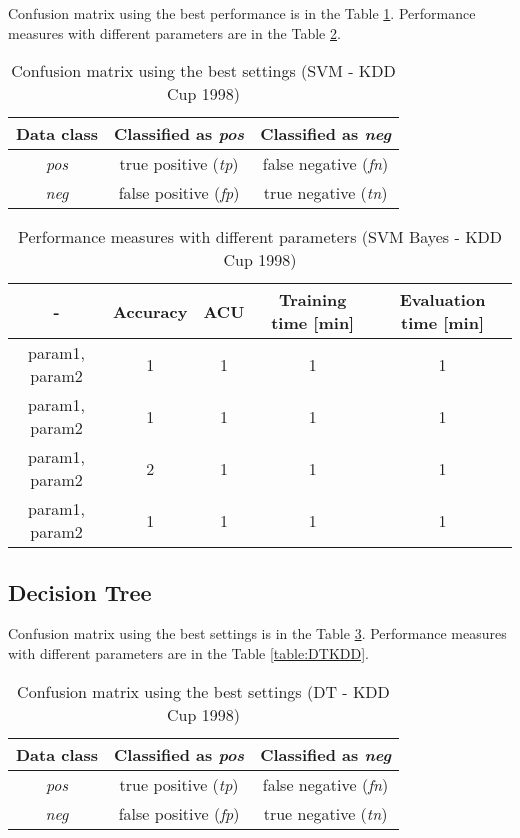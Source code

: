 \documentclass[11pt,a4paper,titlepage]{article}
\begin{document}
Confusion matrix using the best performance is in the Table \ref{table:confusionMatrixSVMKDD}. Performance measures with different parameters are in the Table \ref{table:SVMKDD}.
\begin{table}
  \centering
  \begin{tabular}{| c | c | c |}
    \hline
    Data class & Classified as \textit{pos} & Classified as \textit{neg} \\ \hline
    \textit{pos} & true positive (\textit{tp}) & false negative (\textit{fn}) \\ \hline
    \textit{neg} & false positive (\textit{fp}) & true negative (\textit{tn}) \\
    \hline
  \end{tabular}
  \caption{Confusion matrix using the best settings (SVM - KDD Cup 1998)}
  \label{table:confusionMatrixSVMKDD}
  \end{table}
  
  \begin{table}
  \centering
  \begin{tabular}{| c | c | c | c | c |}
    \hline
     		-	   & Accuracy & 	ACU 	& Training time [min] & Evaluation time [min] \\ \hline
    param1, param2 &  1 	  &     1		& 		1			  & 		1 		\\ \hline
    param1, param2 & 	1	  & 	1 		& 		1			  &			1 		\\ \hline
    param1, param2 & 	2	  & 	1		& 		1			  &			1		\\ \hline
    param1, param2 &  1       & 	1		& 		1			  &			1			\\
    \hline
  \end{tabular}
  \caption{Performance measures with different parameters (SVM Bayes - KDD Cup 1998)}
  \label{table:SVMKDD}
  \end{table}

\subsection{Decision Tree}

Confusion matrix using the best settings is in the Table \ref{table:confusionMatrixDTKDD}. Performance measures with different parameters are in the Table \ref{table:DTKDD}.
\begin{table}
  \centering
  \begin{tabular}{| c | c | c |}
    \hline
    Data class & Classified as \textit{pos} & Classified as \textit{neg} \\ \hline
    \textit{pos} & true positive (\textit{tp}) & false negative (\textit{fn}) \\ \hline
    \textit{neg} & false positive (\textit{fp}) & true negative (\textit{tn}) \\
    \hline
  \end{tabular}
  \caption{Confusion matrix using the best settings (DT - KDD Cup 1998)}
  \label{table:confusionMatrixDTKDD}
  \end{table}
  
\end{document}
